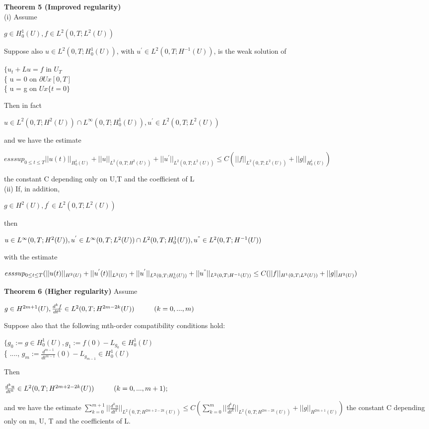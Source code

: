 \documentclass{article}
\newcommand\tab[1][1cm]{\hspace*{#1}}
\begin{document}
\textbf {Theorem 5 (Improved regularity)} \\ \tab (i) Assume
\begin{center}
$g \in H_0^1(U), f \in L^2(0, T; L^2(U))$
\end{center}
Suppose also $u \in L^2(0, T; H_0^1(U))$, with $u^{'} \in L^2(0, T; H^{-1}(U))$, is the weak solution of
\begin{center}
$\{ u_t + Lu = f$ \tab in $U_T$ \\
\{ u = 0 \tab on $\partial U x [0,T]$ \\
\{ u = g \tab on $U x \{t=0\}$
\end{center}
Then in fact
\begin{center}
$u \in L^2(0, T; H^2(U)) \cap L^{\infty} (0, T; H_0^1(U)), u^{'} \in L^2(0, T; L^2(U))$
\end{center}
and we have the estimate
\begin{center}
$ess sup_{0 \leq t \leq T} ||u(t)||_{H_{0}^{1}(U)} + ||u||_{L^{2}(0, T; H^{2}(U))} + ||u^{'}||_{L^{2}(0, T; L^{2}(U))} \leq C(||f||_{L^{2}(0, T; L^{2}(U))} + ||g||_{H_{0}^{1}(U)})$
\end{center}
the constant C depending only on U,T and the coefficient of L  \\ 
\tab (ii) If, in addition, 
\begin{center}
$g \in H^2(U), f^{'} \in L^2(0, T; L^2(U))$
\end{center}
then
\begin{center}
$u \in L^{\infty}(0, T; H^2(U)), u^{'} \in L^{\infty} (0, T; L^2(U)) \cap L^2(0, T; H_0^1(U)), u^{"} \in L^2(0, T; H^{-1}(U))$
\end{center}
with the estimate
\begin{center}
$ess sup_{0 \leq t \leq T} (||u(t)||_{H^{2}(U)} + ||u^{'}(t)||_{L^{2}(U)} + ||u^{'}||_{L^{2}(0, T; H_{0}^{1}(U))} + ||u^{"}||_{L^{2}(0, T; H^{-1}(U))} \leq C(||f||_{H^{1}(0, T; L^{2}(U))} + ||g||_{H^{2}(U)})$
\end{center}

\textbf {Theorem 6 (Higher regularity)} Assume 
\begin{center}
$g \in H^{2m+1}(U), \frac{d^{k}f}{dt^{k}} \in L^2 (0, T; H^{2m-2k}(U)) \tab (k=0,...,m)$
\end{center}
Suppose also that the following mth-order compatibility conditions hold:
\begin{center}
$\{ g_0 := g \in H_0^1(U), g_1 := f(0) - L_{g_{0}} \in H_0^1(U)$ \\
\{ ...., $g_m := \frac{d^{m-1}}{dt^{m-1}} (0) - L_{g_{m-1}} \in H_0^1(U)$
\end{center}
Then 
\begin{center}
$\frac{d^k u}{dt^k} \in L^2 (0, T; H^{2m+2-2k}(U)) \tab (k = 0,...,m+1);$
\end{center}
and we have the estimate
\tab $\sum_{k=0}^{m+1} ||\frac{d^k u}{dt^k}||_{L^{2} (0, T; H^{2m+2-2k}(U))} \leq C(\sum_{k=0}^m ||\frac{d^kf}{dt^k}||_{L^{2}(0, T; H^{2m-2k}(U))} + ||g||_{H^{2m+1}(U)})$
the constant C depending only on m, U, T and the coefficients of L.
\end{document}
